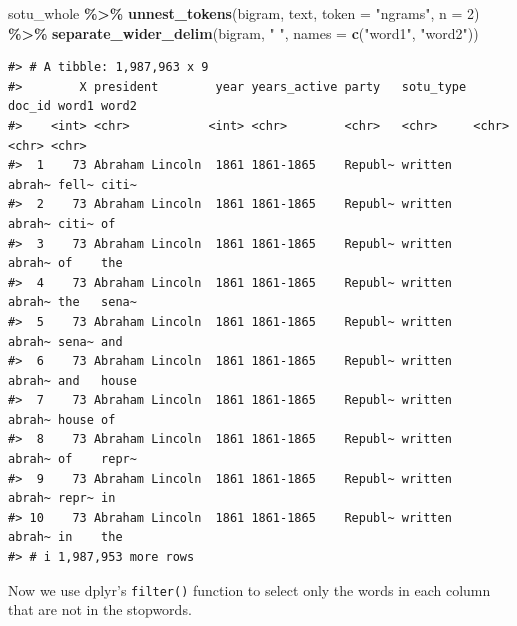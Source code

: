 \documentclass[
]{book}
\newenvironment{Shaded}{\begin{snugshade}}{\end{snugshade}}
\newcommand{\AttributeTok}[1]{\textcolor[rgb]{0.13,0.29,0.53}{#1}}
\newcommand{\CommentTok}[1]{\textcolor[rgb]{0.56,0.35,0.01}{\textit{#1}}}
\newcommand{\DecValTok}[1]{\textcolor[rgb]{0.00,0.00,0.81}{#1}}
\newcommand{\FunctionTok}[1]{\textcolor[rgb]{0.13,0.29,0.53}{\textbf{#1}}}
\newcommand{\NormalTok}[1]{#1}
\newcommand{\SpecialCharTok}[1]{\textcolor[rgb]{0.81,0.36,0.00}{\textbf{#1}}}
\newcommand{\StringTok}[1]{\textcolor[rgb]{0.31,0.60,0.02}{#1}}
\begin{document}
\begin{Shaded}
\begin{Highlighting}[]
\NormalTok{sotu\_whole }\SpecialCharTok{\%\textgreater{}\%}
  \FunctionTok{unnest\_tokens}\NormalTok{(bigram, text, }\AttributeTok{token =} \StringTok{"ngrams"}\NormalTok{, }\AttributeTok{n =} \DecValTok{2}\NormalTok{) }\SpecialCharTok{\%\textgreater{}\%} 
  \FunctionTok{separate\_wider\_delim}\NormalTok{(bigram, }\StringTok{" "}\NormalTok{, }\AttributeTok{names =} \FunctionTok{c}\NormalTok{(}\StringTok{"word1"}\NormalTok{, }\StringTok{"word2"}\NormalTok{))}
\end{Highlighting}
\end{Shaded}

\begin{verbatim}
#> # A tibble: 1,987,963 x 9
#>        X president        year years_active party   sotu_type doc_id word1 word2
#>    <int> <chr>           <int> <chr>        <chr>   <chr>     <chr>  <chr> <chr>
#>  1    73 Abraham Lincoln  1861 1861-1865    Republ~ written   abrah~ fell~ citi~
#>  2    73 Abraham Lincoln  1861 1861-1865    Republ~ written   abrah~ citi~ of   
#>  3    73 Abraham Lincoln  1861 1861-1865    Republ~ written   abrah~ of    the  
#>  4    73 Abraham Lincoln  1861 1861-1865    Republ~ written   abrah~ the   sena~
#>  5    73 Abraham Lincoln  1861 1861-1865    Republ~ written   abrah~ sena~ and  
#>  6    73 Abraham Lincoln  1861 1861-1865    Republ~ written   abrah~ and   house
#>  7    73 Abraham Lincoln  1861 1861-1865    Republ~ written   abrah~ house of   
#>  8    73 Abraham Lincoln  1861 1861-1865    Republ~ written   abrah~ of    repr~
#>  9    73 Abraham Lincoln  1861 1861-1865    Republ~ written   abrah~ repr~ in   
#> 10    73 Abraham Lincoln  1861 1861-1865    Republ~ written   abrah~ in    the  
#> # i 1,987,953 more rows
\end{verbatim}

Now we use dplyr's \texttt{filter()} function to select only the words in each column that are not in the stopwords.

\begin{Shaded}
\end{Shaded}
\end{document}
